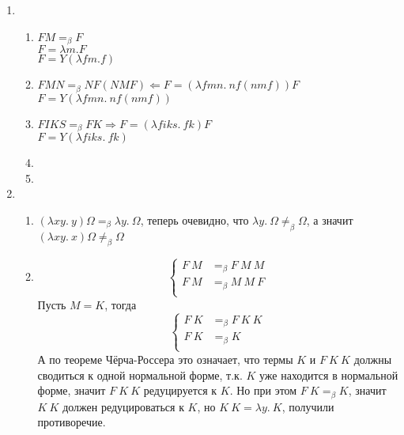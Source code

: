 
\begin{enumerate}
  \item
    \begin{enumerate}
      \item
        $ FM =_{\beta} F$\\
        $ F = \lambda m. F $\\
        $ F = Y(\lambda fm. f) $
        
      \item
        $ FMN =_\beta NF(NMF) \Leftarrow F = (\lambda fmn.~nf(nmf))F $\\
        $ F = Y(\lambda fmn.~nf(nmf)) $
      
      \item
        $ FIKS =_\beta FK  \Rightarrow F = (\lambda fiks.~fk)F $\\
        $ F = Y(\lambda fiks.~fk) $
      
      \item
      
      \item
    
    \end{enumerate}
  
  \item
    \begin{enumerate}
      \item      
        $ (\lambda xy.~y) \Omega =_\beta \lambda y.~\Omega$, теперь очевидно, что $ \lambda y.~\Omega \neq_\beta \Omega$, а значит $(\lambda xy.~x)\Omega \neq_\beta \Omega$

      \item
        $$
          \left\{
            \begin{aligned}
              F~M &=_\beta F~M~M\\
              F~M &=_\beta M~M~F\\
            \end{aligned}            
          \right.
        $$
        Пусть $ M = K $, тогда
        $$
          \left\{
            \begin{aligned}
              F~K &=_\beta F~K~K\\
              F~K &=_\beta K\\
            \end{aligned}            
          \right.
        $$
        А по теореме Чёрча-Россера это означает, что термы $K$ и $F~K~K$ должны сводиться к одной нормальной форме, т.к. $K$ уже находится в нормальной форме, значит $F~K~K$ редуцируется к $K$. Но при этом $F~K =_\beta K$, значит $K~K$ должен редуцироваться к $K$, но $K~K = \lambda y.~K$, получили противоречие.
        

\end{enumerate}
\end{enumerate}
